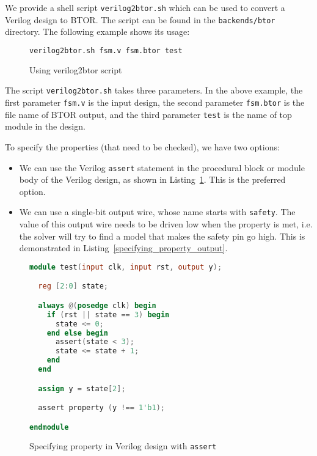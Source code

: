 \documentclass[9pt,technote,a4paper]{IEEEtran}
\begin{document}
We provide a shell script {\tt verilog2btor.sh} which can be used to
convert a Verilog design to BTOR. The script can be found in the
{\tt backends/btor} directory. The following example shows its usage:

\begin{figure}[H]
\begin{lstlisting}[language=sh,numbers=none]
verilog2btor.sh fsm.v fsm.btor test
\end{lstlisting}
 \renewcommand{\figurename}{Listing}
\caption{Using verilog2btor script}
\end{figure}

The script {\tt verilog2btor.sh} takes three parameters.  In the above
example, the first parameter {\tt fsm.v} is the input design, the second
parameter {\tt fsm.btor} is the file name of BTOR output, and the third
parameter {\tt test} is the name of top module in the design.

To specify the properties (that need to be checked), we have two
options:
\begin{itemize}
\item We can use the Verilog {\tt assert} statement in the procedural block
  or module body of the Verilog design, as shown in
  Listing~\ref{specifying_property_assert}. This is the preferred option.
\item We can use a single-bit output wire, whose name starts with
  {\tt safety}.  The value of this output wire needs to be driven low
  when the property is met, i.e. the solver will try to find a model
  that makes the safety pin go high. This is demonstrated in
  Listing~\ref{specifying_property_output}.
\end{itemize}

\begin{figure}[H]
\begin{lstlisting}[language=Verilog,numbers=none]
module test(input clk, input rst, output y);

  reg [2:0] state;

  always @(posedge clk) begin
    if (rst || state == 3) begin
      state <= 0;
    end else begin
      assert(state < 3);
      state <= state + 1;
    end
  end

  assign y = state[2];

  assert property (y !== 1'b1);

endmodule
\end{lstlisting}
\renewcommand{\figurename}{Listing}
\caption{Specifying property in Verilog design with {\tt assert}}
\label{specifying_property_assert}
\end{figure}
\end{document}

